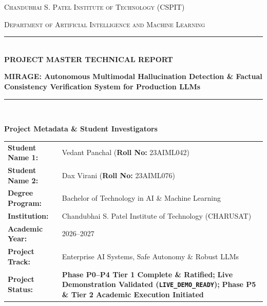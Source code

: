 \documentclass[11pt,a4paper]{article}
\begin{document}
\begin{titlepage}
    \centering
    \vspace*{0.3cm}
    
    {\Large\scshape Chandubhai S. Patel Institute of Technology (CSPIT)\par}
    \vspace{0.2cm}
    {\large\scshape Department of Artificial Intelligence and Machine Learning\par}
    \vspace{0.6cm}
    
    \rule{\linewidth}{1.5pt}\\[0.3cm]
    {\huge\bfseries\color{primarynavy} PROJECT MASTER TECHNICAL REPORT\\[0.3cm]}
    {\Large\bfseries\color{accentteal} MIRAGE: Autonomous Multimodal Hallucination Detection \& Factual Consistency Verification System for Production LLMs\par}
    \rule{\linewidth}{1.5pt}\\[0.8cm]
    
    \begin{tcolorbox}[colback=lightgreybg,colframe=primarynavy,arc=2mm,boxrule=1pt,width=0.96\linewidth]
        \centering
        \textbf{\large Project Metadata \& Student Investigators}\\[0.2cm]
        \begin{tabularx}{\linewidth}{p{3.8cm} X}
            \textbf{Student Name 1:} & Vedant Panchal \quad (\textbf{Roll No:} 23AIML042) \\
            \textbf{Student Name 2:} & Dax Virani \quad (\textbf{Roll No:} 23AIML076) \\
            \textbf{Degree Program:} & Bachelor of Technology in AI \& Machine Learning \\
            \textbf{Institution:}    & Chandubhai S. Patel Institute of Technology (CHARUSAT) \\
            \textbf{Academic Year:}  & 2026--2027 \\
            \textbf{Project Track:}  & Enterprise AI Systems, Safe Autonomy \& Robust LLMs \\
            \textbf{Project Status:} & \textbf{Phase P0--P4 Tier 1 Complete \& Ratified;} \newline
                                     \textbf{Live Demonstration Validated (\texttt{LIVE\_DEMO\_READY});} \newline
                                     \textbf{Phase P5 \& Tier 2 Academic Execution Initiated}
        \end{tabularx}
    \end{tcolorbox}
    

\end{titlepage}
\end{document}

